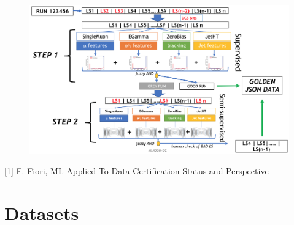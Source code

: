 \documentclass{beamer}
\begin{document}

\begin{frame}
\begin{figure}
\includegraphics[height=0.85\textheight, width=\textwidth]{images/cartoon}
\end{figure}
\tiny [1] F. Fiori, ML Applied To Data Certification Status and Perspective
\end{frame}

\section{Datasets} %
\subsection{}
\end{document}
